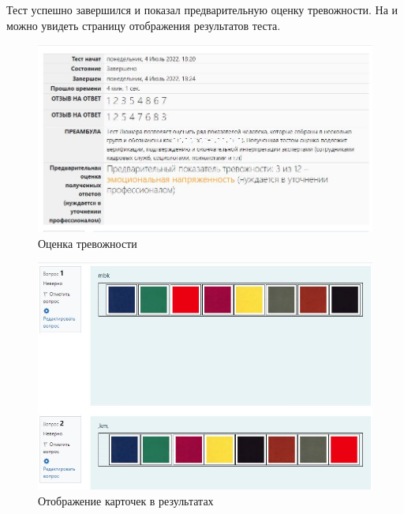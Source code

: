 Тест успешно завершился и показал предварительную оценку тревожности. На  и  можно увидеть страницу отображения результатов теста.
\FloatBarrier %
\begin{figure}[ht] 
	\center
	\includegraphics [scale=0.7] {my_folder/images/restest1}
	\caption{Оценка тревожности} 
	\label{fig:res1}  
\end{figure}
\FloatBarrier %

\FloatBarrier %
\begin{figure}[ht] 
	\center
	\includegraphics [scale=0.7] {my_folder/images/restest2}
	\caption{Отображение карточек в результатах} 
	\label{fig:res2}  
\end{figure}
\FloatBarrier %

